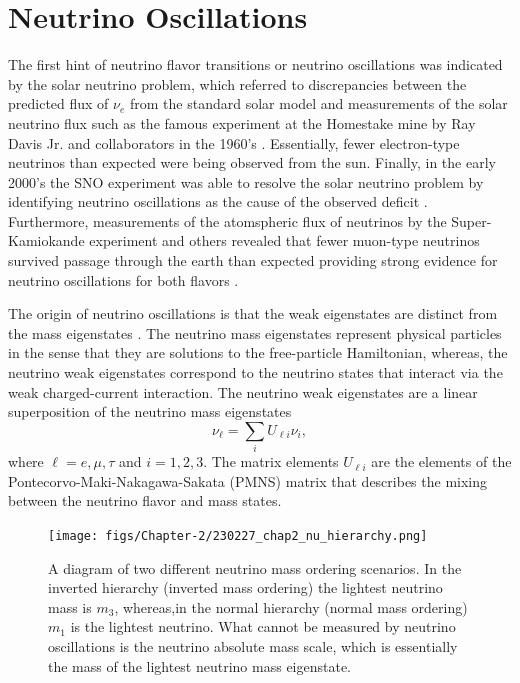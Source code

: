 \section{Neutrino Oscillations}
\label{sec:chap2-nu-oscillation}

The first hint of neutrino flavor transitions or neutrino oscillations was indicated by the solar neutrino problem, which referred to discrepancies between the predicted flux of $\nu_e$ from the standard solar model and measurements of the solar neutrino flux such as the famous experiment at the Homestake mine by Ray Davis Jr. and collaborators in the 1960's \cite{ray_davis}. Essentially, fewer electron-type neutrinos than expected were being observed from the sun. Finally, in the early 2000's the SNO experiment was able to resolve the solar neutrino problem by identifying neutrino oscillations as the cause of the observed deficit \cite{SNO}. Furthermore, measurements of the atomspheric flux of neutrinos by the Super-Kamiokande experiment and others revealed that fewer muon-type neutrinos survived passage through the earth than expected providing strong evidence for neutrino oscillations for both flavors \cite{superk}.

The origin of neutrino oscillations is that the weak eigenstates are distinct from the mass eigenstates \cite{nu_oscillations}. The neutrino mass eigenstates represent physical particles in the sense that they are solutions to the free-particle Hamiltonian, whereas, the neutrino weak eigenstates correspond to the neutrino states that interact via the weak charged-current interaction. The neutrino weak eigenstates are a linear superposition of the neutrino mass eigenstates
\begin{equation}
    \nu_\ell=\sum_i{U_{\ell i}\nu_i},
\end{equation}
where $\ell=e,\mu,\tau$ and $i=1,2,3$. The matrix elements $U_{\ell i}$ are the elements of the Pontecorvo-Maki-Nakagawa-Sakata (PMNS) matrix that describes the mixing between the neutrino flavor and mass states.

\begin{figure}[htbp]
    \centering
    \texttt{[image: figs/Chapter-2/230227\_chap2\_nu\_hierarchy.png]}
    \caption{A diagram of two different neutrino mass ordering scenarios. In the inverted hierarchy (inverted mass ordering) the lightest neutrino mass is $m_3$, whereas,in the normal hierarchy (normal mass ordering) $m_1$ is the lightest neutrino. What cannot be measured by neutrino oscillations is the neutrino absolute mass scale, which is essentially the mass of the lightest neutrino mass eigenstate.}
    \label{fig:chap2-nu-hierarchy}
\end{figure}

